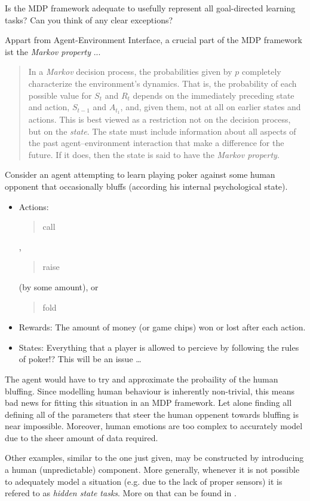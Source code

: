 
\begin{exercise}[Exercise 3.2]

Is the MDP framework adequate to usefully represent all goal-directed learning tasks?
Can you think of any clear exceptions?

\end{exercise}


\begin{solution}

Appart from Agent-Environment Interface, a crucial part of the MDP framework ist the \textit{Markov property} ...

\blockquote
{
    In a \textit{Markov} decision process, the probabilities given by $p$ completely characterize the environment's dynamics.
    That is, the probability of each possible value for $S_t$ and $R_t$ depends on the immediately preceding state and action, $S_{t-1}$ and $A_{t_1}$, and, given them, not at all on earlier states and actions.
    This is best viewed as a restriction not on the decision process, but on the \textit{state}.
    The state must include information about all aspects of the past agent–environment interaction that make a difference for the future.
    If it does, then the state is said to have the \textit{Markov property}.
}
\cite*[page 49]{SuttonRichardS2018Rl:a}

Consider an agent attempting to learn playing poker against some human opponent that occasionally bluffs (according his internal psychological state).

\begin{itemize}
    \item Actions:
    \blockquote{call}, \blockquote{raise} (by some amount), or \blockquote{fold};
    \item Rewards:
    The amount of money (or game chips) won or lost after each action.
    \item States:
    Everything that a player is allowed to percieve by following the rules of poker!?
    This will be an issue \dots
\end{itemize}

The agent would have to try and approximate the probaility of the human bluffing.
Since modelling human behaviour is inherently non-trivial, this means bad news for fitting this situation in an MDP framework.
Let alone finding all defining all of the parameters that steer the human oppenent towards bluffing is near impossible.
Moreover, human emotions are too complex to accurately model due to the sheer amount of data required.

Other examples, similar to the one just given, may be constructed by introducing a human (unpredictable) component.
More generally, whenever it is not possible to adequately model a situation (e.g. due to the lack of proper sensors) it is refered to as \textit{hidden state tasks}.
More on that can be found in \cite{WhiteheadStevenD1995Rlon}.

\end{solution}

